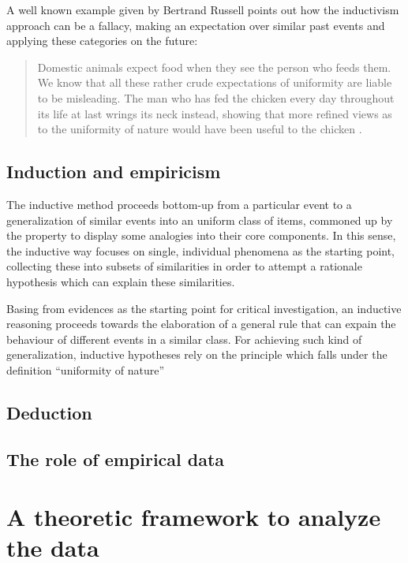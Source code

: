 \documentclass[
  a4paper,
  twoside,
  12pt,
  chapterprefix=false,
  bibliography=totocnumbered,
  listof=flat]{scrbook}
\begin{document}
A well known example given by Bertrand Russell points out how the inductivism approach can be a fallacy, making an expectation over similar past events and applying these categories on the future:

\begin{quote}
Domestic animals expect food when they see the person who feeds them. We know that all these rather crude expectations of uniformity are liable to be misleading. The man who has fed the chicken every day throughout its life at last wrings its neck instead, showing that more refined views as to the uniformity of nature would have been useful to the chicken \citep{russellProblems}.
\end{quote}

\hypertarget{induction-and-empiricism}{%
\subsection{Induction and empiricism}\label{induction-and-empiricism}}

The inductive method proceeds bottom-up from a particular event to a generalization of similar events into an uniform class of items, commoned up by the property to display some analogies into their core components. In this sense, the inductive way focuses on single, individual phenomena as the starting point, collecting these into subsets of similarities in order to attempt a rationale hypothesis which can explain these similarities.

Basing from evidences as the starting point for critical investigation, an inductive reasoning proceeds towards the elaboration of a general rule that can expain the behaviour of different events in a similar class. For achieving such kind of generalization, inductive hypotheses rely on the principle which falls under the definition ``uniformity of nature''

\hypertarget{deduction}{%
\subsection{Deduction}\label{deduction}}

\hypertarget{the-role-of-empirical-data}{%
\subsection{The role of empirical data}\label{the-role-of-empirical-data}}

\hypertarget{a-theoretic-framework-to-analyze-the-data}{%
\section{A theoretic framework to analyze the data}\label{a-theoretic-framework-to-analyze-the-data}}
\end{document}
